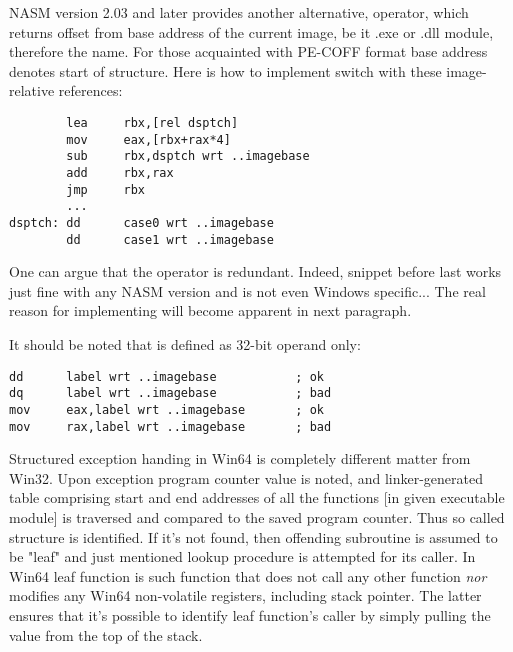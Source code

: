 NASM version 2.03 and later provides another alternative,  operator, which returns offset from base address of the
current image, be it .exe or .dll module, therefore the name. For those
acquainted with PE-COFF format base address denotes start of
 structure. Here is how to implement switch with
these image-relative references:

\begin{lstlisting}
        lea     rbx,[rel dsptch]
        mov     eax,[rbx+rax*4]
        sub     rbx,dsptch wrt ..imagebase
        add     rbx,rax
        jmp     rbx
        ...
dsptch: dd      case0 wrt ..imagebase
        dd      case1 wrt ..imagebase
\end{lstlisting}

One can argue that the operator is redundant. Indeed, snippet before
last works just fine with any NASM version and is not even Windows
specific... The real reason for implementing  will
become apparent in next paragraph.

It should be noted that  is defined as 32-bit
operand only:

\begin{lstlisting}
dd      label wrt ..imagebase           ; ok
dq      label wrt ..imagebase           ; bad
mov     eax,label wrt ..imagebase       ; ok
mov     rax,label wrt ..imagebase       ; bad
\end{lstlisting}


Structured exception handing in Win64 is completely different matter
from Win32. Upon exception program counter value is noted, and
linker-generated table comprising start and end addresses of all the
functions [in given executable module] is traversed and compared to the
saved program counter. Thus so called  structure is
identified. If it's not found, then offending subroutine is assumed to
be "leaf" and just mentioned lookup procedure is attempted for its
caller. In Win64 leaf function is such function that does not call any
other function \emph{nor} modifies any Win64 non-volatile registers,
including stack pointer. The latter ensures that it's possible to
identify leaf function's caller by simply pulling the value from the
top of the stack.

